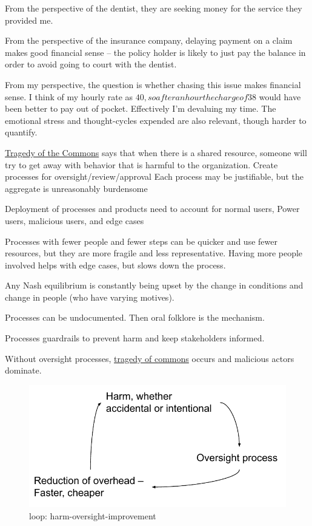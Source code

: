 From the perspective of the dentist, they are seeking money for the service they provided me.

From the perspective of the insurance company, delaying payment on a claim makes good financial sense -- the policy holder is likely to just pay the balance in order to avoid going to court with the dentist.

From my perspective, the question is whether chasing this issue makes financial sense. I think of my hourly rate as $40, so after an hour the charge of $38 would have been better to pay out of pocket. Effectively I'm devaluing my time. The emotional stress and thought-cycles expended are also relevant, though harder to quantify.


\href{https://en.wikipedia.org/wiki/Tragedy_of_the_commons}{Tragedy of the Commons} says that when there is a shared resource, someone will try to get away with behavior that is harmful to the organization.
Create processes for oversight/review/approval
Each process may be justifiable, but the aggregate is unreasonably burdensome


Deployment of processes and products need to account for 
normal users, Power users, malicious users, and edge cases



Processes with fewer people and fewer steps can be quicker and use fewer resources, but they are more fragile and less representative. Having more people involved helps with edge cases, but slows down the process. 

Any Nash equilibrium is constantly being upset by the change in conditions and change in people (who have varying motives).


Processes can be undocumented. Then oral folklore is the mechanism. 
    
Processes guardrails to prevent harm and keep stakeholders informed. 
    
Without oversight processes, \href{https://en.wikipedia.org/wiki/Tragedy_of_the_commons}{tragedy of commons} occurs and malicious actors dominate.
    


\begin{figure}
    \centering
    \includegraphics{images/process_loop_harm-oversight-improvement}
    \caption{loop: harm-oversight-improvement}
    \label{fig:harm-oversight-improvement}
\end{figure}


